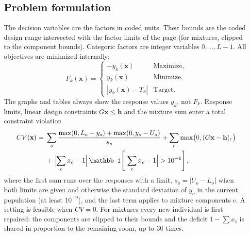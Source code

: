 \subsection{Problem formulation}
The decision variables are the factors in coded units. Their bounds are the coded design range intersected with
the factor limits of the  page (for mixtures, clipped to the component bounds). Categoric factors
are integer variables $0,\dots,L-1$. All objectives are minimized internally:
\begin{equation}
F_k(\mathbf x)=\begin{cases}-y_k(\mathbf x) & \text{Maximize},\\ y_k(\mathbf x) & \text{Minimize},\\
|y_k(\mathbf x)-T_k| & \text{Target.}\end{cases}
\label{eq:ch08-F}
\end{equation}
The graphs and tables always show the response values $y_k$, not $F_k$. Response limits, linear design constraints
$G\mathbf x\le\mathbf h$ and the mixture sum enter a total constraint violation
\begin{equation}
\begin{split}
CV(\mathbf x)={}&\sum_o\frac{\max(0,L_o-y_o)+\max(0,y_o-U_o)}{s_o}+\sum_r\max\bigl(0,(G\mathbf x-\mathbf h)_r\bigr)\\
&+\Bigl|\sum_{c}x_c-1\Bigr|\,\mathbb 1\!\left[\Bigl|\sum_c x_c-1\Bigr|>10^{-6}\right],
\end{split}
\label{eq:ch08-cv}
\end{equation}
where the first sum runs over the responses with a limit, $s_o=|U_o-L_o|$ when both limits are given and
otherwise the standard deviation of $y_o$ in the current population (at least $10^{-9}$), and the last term
applies to mixture components $c$. A setting is feasible when $CV=0$. For mixtures every new individual is first
repaired: the components are clipped to their bounds and the deficit $1-\sum x_c$ is shared in proportion to the
remaining room, up to 30 times.

